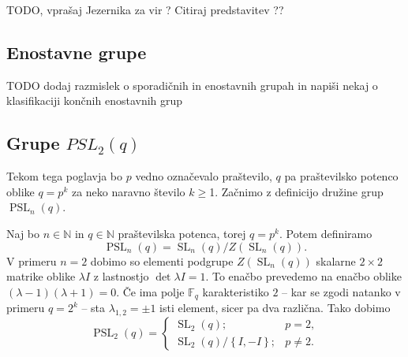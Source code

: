 \documentclass[mat1, tisk]{fmfdelo}
\numberwithin{equation}{section}  %
\begin{document}
\begin{trditev}
\label{trd_babaijeva_domneva}
 TODO, vprašaj Jezernika za vir ? Citiraj predstavitev ?? 
\end{trditev}

\subsection{Enostavne grupe}


TODO dodaj razmislek o sporadičnih in enostavnih grupah in napiši nekaj o klasifikaciji končnih enostavnih grup

\subsection{Grupe $PSL_2(q)$}\label{sec_grupe_psl2q}

Tekom tega poglavja bo $p$ vedno označevalo praštevilo, $q$ pa praštevilsko potenco oblike $q = p^{k}$ za neko naravno število $k \ge $1. Začnimo z definicijo družine grup $\operatorname{PSL}_n(q)$.

\begin{definicija}\label{def_pslnq_in_psl2q}
    Naj bo $n \in \mathbb{N}$ in $q \in \mathbb{N}$ praštevilska potenca, torej $q = p^{k}$. Potem definiramo \begin{equation*}
        \operatorname{PSL}_n(q) = {\operatorname{SL}_n(q)} / {Z(\operatorname{SL}_n(q))}.
     \end{equation*}   
    V primeru $n = 2$ dobimo so elementi podgrupe $Z(\operatorname{SL}_n(q))$ skalarne $2 \times 2$ matrike oblike $\lambda I$ z lastnostjo $\det \lambda I = 1$. To enačbo prevedemo na enačbo oblike $(\lambda - 1)(\lambda + 1) = 0$.
    Če ima polje $\mathbb{F}_q$ karakteristiko $2$ -- kar se zgodi natanko v primeru $q = 2^{k}$ -- sta $\lambda_{1,2} = \pm 1$ isti element, sicer pa dva različna. Tako dobimo
    \begin{equation*}
                \operatorname{PSL}_2(q) = \begin{cases}
                    \operatorname{SL}_2(q); & p = 2,  \\
                    {\operatorname{SL}_2(q)} / {\left\{ I, -I \right\} }; & p \neq 2.
                \end{cases}
             \end{equation*}   
    \end{definicija}
    
\end{document}

